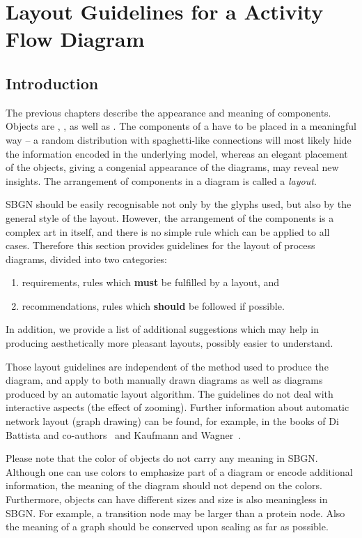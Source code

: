 \chapter{Layout Guidelines for a Activity Flow Diagram}
\label{chp:af:layout}

\section{Introduction}

The previous chapters describe the appearance and meaning of
\SBGNAFLone components. Objects are , , 
 as well as . 
The components of a \AF have to be placed in a meaningful way -- a random
distribution with spaghetti-like connections will most likely hide
the information encoded in the underlying model, whereas an elegant
placement of the objects, giving a congenial appearance of the
diagrams, may reveal new insights. The arrangement of components in a
diagram is called a \emph{layout}.

SBGN \AFs should be easily recognisable not only by the
glyphs used, but also by the general style of the layout. However, the
arrangement of the components is a complex art in itself, and there is
no simple rule which can be applied to all cases. Therefore this
section provides guidelines for the layout of process diagrams, divided
into two categories:
\begin{enumerate}
  \item requirements, \ie rules which \textbf{must} be fulfilled by a
  layout, and
  \item recommendations, \ie rules which \textbf{should} be followed if
  possible.
\end{enumerate}
In addition, we provide a list of additional suggestions which may help in 
producing aesthetically more pleasant layouts, possibly easier to understand.

Those layout guidelines are independent of the method used to produce
the diagram, and apply to both manually drawn diagrams as well as
diagrams produced by an automatic layout algorithm. The guidelines do
not deal with interactive aspects (\eg the effect of zooming). 
Further information about automatic network layout
(graph drawing) can be found, for example, in the books of Di Battista and
co-authors~\cite{DiBattista:1998} and Kaufmann and Wagner~\cite{Kaufmann:2001}.

Please note that the color of objects do not carry any meaning in
SBGN. Although one can use colors to emphasize part of a diagram or
encode additional information, the meaning of the diagram should not
depend on the colors. Furthermore, objects can have different sizes
and size is also meaningless in SBGN. For example, a transition node
may be larger than a protein node. Also the meaning of a graph
should be conserved upon scaling as far as possible.

